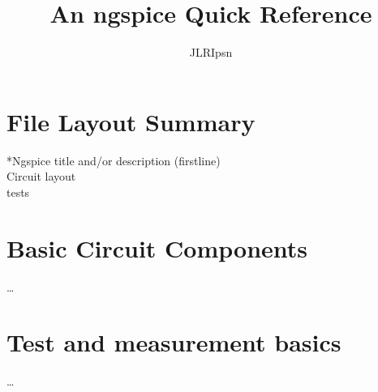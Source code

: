 \documentclass{article}
\author{JLRIpsn}
\title{An ngspice Quick Reference}
\begin{document}
\maketitle
\section{File Layout Summary}

*Ngspice title and/or description (firstline) \\
Circuit layout\\
tests

\section{Basic Circuit Components}
\ldots{}
\section{Test and measurement basics}
\ldots{}
\end{document}
